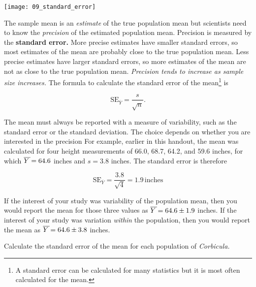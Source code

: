 \documentclass[12pt]{exam}
\newcommand*\meanY{\overline{Y\kern1.67pt}\kern-1.67pt}
\newcommand*\meansubY{\overline{Y}}
\begin{document}
\begin{questions}
\hfil\begin{minipage}{0.8\textwidth}
	\texttt{[image: 09\_standard\_error]}
\end{minipage}\hfill

\bigskip

The sample mean is an \emph{estimate} of the true population mean but scientists 
need to know the \emph{precision} of the estimated population mean. Precision 
is measured by the \textbf{standard error.} More precise estimates have smaller 
standard errors, so most estimates of the mean are probably close to the true population mean. Less precise estimates have larger standard errors, so more estimates of the mean are not as close to the true population mean. \emph{Precision tends to increase as sample size increases.} The formula to calculate the standard error of the mean\footnote{A standard error can be calculated for many statistics but it is most often calculated for the mean.} is

\[ \mathrm{SE}_{\meansubY} = \frac{s}{\sqrt{n}}. \]

The mean must always be reported with a measure of variability, such as the standard error
or the standard deviation. The choice depends on whether you are interested in the precision 
For example, earlier in this handout, the mean was calculated for four height measurements 
of 66.0, 68.7, 64.2, and 59.6 inches, for which $\meanY = 64.6$ inches and $s=3.8$ inches. 
The standard error is therefore

\[	\mathrm{SE}_{\meansubY} = \frac{3.8}{\sqrt{4}} = 1.9\,\mathrm{inches} \]

If the interest of your study was variability of the population mean, then you would report the mean for those three values as $\meanY = 64.6 \pm 1.9$ inches. If the interest of your study was variation \emph{within} the population, then you would report the mean as $\meanY = 64.6 \pm 3.8$ inches. 

\question
Calculate the standard error of the mean for each population of \textit{Corbicula.}


\end{questions}
\end{document}
